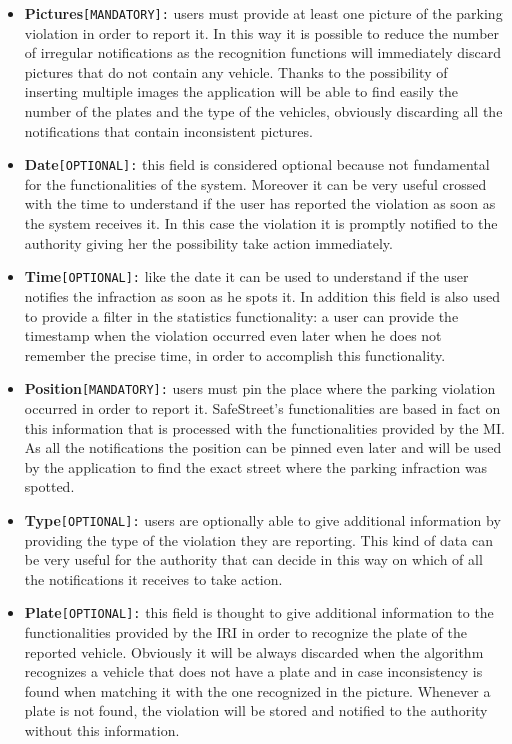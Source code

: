 		\begin{itemize}
			\item \textbf{Pictures}\texttt{[MANDATORY]:} users must provide at least one picture of the parking violation in order to report it. In this way it is possible to reduce the number of irregular notifications as the recognition functions will immediately discard pictures that do not contain any vehicle. Thanks to the possibility of inserting multiple images the application will be able to find easily the number of the plates and the type of the vehicles, obviously discarding all the notifications that contain inconsistent pictures.
			
			\item \textbf{Date}\texttt{[OPTIONAL]:} this field is considered optional because not fundamental for the functionalities of the system. Moreover it can be very useful crossed with the time to understand if the user has reported the violation as soon as the system receives it. In this case the violation it is promptly notified to the authority giving her the possibility take action immediately.
			
			\item \textbf{Time}\texttt{[OPTIONAL]:} like the date it can be used to understand if the user notifies the infraction as soon as he spots it. In addition this field is also used to provide a filter in the statistics functionality: a user can provide the timestamp when the violation occurred even later when he does not remember the precise time, in order to accomplish this functionality.
			
			\item \textbf{Position}\texttt{[MANDATORY]:} users must pin the place where the parking violation occurred in order to report it. SafeStreet's functionalities are based in fact on this information that is processed with the functionalities provided by the MI. As all the notifications the position can be pinned even later and will be used by the application to find the exact street where the parking infraction was spotted.
			
			\item \textbf{Type}\texttt{[OPTIONAL]:} users are optionally able to give additional information by providing the type of the violation they are reporting. This kind of data can be very useful for the authority that can decide in this way on which of all the notifications it receives to take action.
			
			\item \textbf{Plate}\texttt{[OPTIONAL]:} this field is thought to give additional information to the functionalities provided by the IRI in order to recognize the plate of the reported vehicle. Obviously it will be always discarded when the algorithm recognizes a vehicle that does not have a plate and in case inconsistency is found when matching it with the one recognized in the picture. Whenever a plate is not found, the violation will be stored and notified to the authority without this information. 
		\end{itemize}
	
